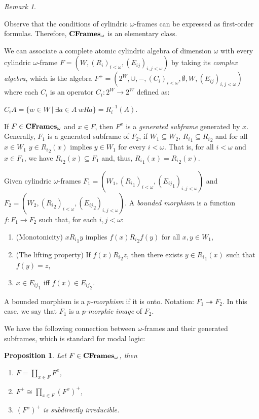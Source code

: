 \documentclass{article}
\theoremstyle{defin}
\theoremstyle{theorem}
\theoremstyle{claim}
\theoremstyle{prop}
\newtheorem{prop}{Proposition}
\theoremstyle{lemma}
\theoremstyle{fact}
\theoremstyle{remark}
\newtheorem{remark}{Remark}
\theoremstyle{ex}
\theoremstyle{col}
\theoremstyle{question}
\begin{document}
\begin{remark}

$ $

Observe that the conditions of cylindric $\omega$-frames can be expressed as first-order formulas. Therefore, ${\bf CFrames}_{\omega}$ is an elementary class.
\end{remark}

We can associate a complete atomic cylindric algebra of dimension $\omega$ with every cylindric $\omega$-frame $F = (W, (R_i)_{i < \omega}, (E_{ij})_{i, j < \omega})$ by taking its \emph{complex algebra}, which is the algebra $F^{+} = (2^{W}, \cup, -, (C_i)_{i < \omega}, \emptyset, W, (E_{ij})_{i, j < \omega})$ where each $C_i$ is an operator $C_i : 2^W \to 2^W$ defined as:
\begin{center}
$C_i A = \{ w \in W \: | \: \exists a \in A \: w R a \} = R_i^{-1}(A)$.
\end{center}

If $F \in {\bf CFrames}_{\omega}$ and $x \in F$, then $F^{x}$ is a \emph{generated subframe} generated by $x$. Generally, $F_1$ is a generated subframe of $F_2$, if $W_1 \subseteq W_2$, ${R_i}_1 \subseteq {R_i}_2$ and for all $x \in W_1$ $y \in {R_i}_2(x)$ implies $y \in W_1$ for every $i < \omega$. That is, for all $i < \omega$ and $x \in F_1$, we have ${R_i}_2(x) \subseteq F_1$ and, thus, ${R_i}_1(x) = {R_i}_2(x)$.

Given cylindric $\omega$-frames $F_1 = (W_1, ({R_i}_1)_{i < \omega}, ({E_{ij}}_1)_{i, j < \omega})$ and \\ $F_2 = (W_2, ({R_i}_2)_{i < \omega}, ({E_{ij}}_2)_{i, j < \omega})$. A \emph{bounded morphism} is a function $f : F_1 \to F_2$ such that, for each $i, j < \omega$:
\begin{enumerate}
\item (Monotonicity) $x {R_i}_1 y$ implies $f(x) {R_i}_2 f(y)$ for all $x, y \in W_1$,
\item (The lifting property) If $f(x) {R_i}_2 z$, then there exists $y \in {R_i}_1(x)$ such that $f(y) = z$,
\item $x \in {E_{ij}}_1$ iff $f(x) \in {E_{ij}}_2$.
\end{enumerate}
A bounded morphism is a \emph{$p$-morphism} if it is onto. Notation: $F_1 \twoheadrightarrow F_2$. In this case, we say that $F_1$ is a \emph{$p$-morphic image} of $F_2$. 

We have the following connection between $\omega$-frames and their generated subframes, which is standard for modal logic:
\begin{prop}
Let $F \in {\bf CFrames}_{\omega}$, then
\begin{enumerate}
\item $F = \coprod \limits_{x \in F} F^{x}$,
\item $F^+ \cong \prod \limits_{x \in F} (F^{x})^+$,
\item $(F^{x})^+$ is subdirectly irreducible.
\end{enumerate}
\end{prop}
\end{document}
